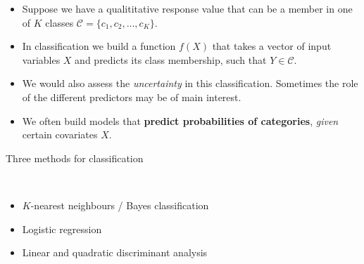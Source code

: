 \documentclass[10pt,ignorenonframetext,]{beamer}
\begin{document}
\begin{frame}

\begin{itemize}
\item
  Suppose we have a qualititative response value that can be a member in
  one of \(K\) classes \(\mathcal{C} = \{c_1, c_2, \ldots , c_K\}\).
\item
  In classification we build a function \(f(X)\) that takes a vector of
  input variables \(X\) and predicts its class membership, such that
  \(Y \in \mathcal{C}\).
\item
  We would also assess the \emph{uncertainty} in this classification.
  Sometimes the role of the different predictors may be of main
  interest.
\item
  We often build models that \textbf{predict probabilities of
  categories}, \emph{given} certain covariates \(X\).
\end{itemize}

\end{frame}

\begin{frame}

\begin{block}{Three methods for classification}

\(~\)

\begin{itemize}
\item
  \(K\)-nearest neighbours / Bayes classification
\item
  Logistic regression
\item
  Linear and quadratic discriminant analysis
\end{itemize}

\end{block}

\end{frame}
\end{document}
